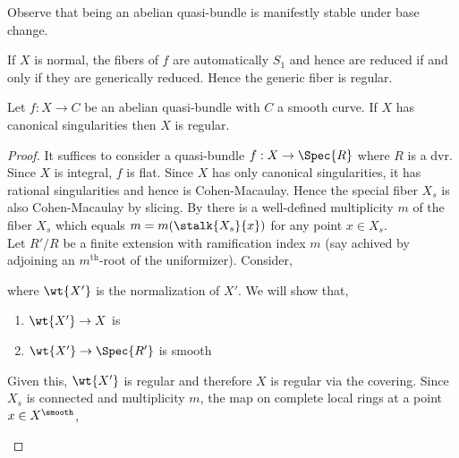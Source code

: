 \documentclass[12pt]{article}
\begin{document}
\begin{rmk}
Observe that being an abelian quasi-bundle is manifestly stable under base change.
\end{rmk}

\begin{rmk}
If $X$ is normal, the fibers of $f$ are automatically $S_1$ and hence are reduced if and only if they are generically reduced. Hence the generic fiber is regular.
\end{rmk}


\begin{lemma} \label{quasi_bundle_regular}
Let $f : X \to C$ be an abelian quasi-bundle with $C$ a smooth curve. If $X$ has canonical singularities then $X$ is regular. 
\end{lemma}

\begin{proof}
It suffices to consider a quasi-bundle $f : X \to \Spec{R}$ where $R$ is a dvr. Since $X$ is integral, $f$ is flat. Since $X$ has only canonical singularities, it has rational singularities and hence is Cohen-Macaulay. Hence the special fiber $X_s$ is also Cohen-Macaulay by slicing. By \cite[Lemma 2.1]{multiple_structures} there is a well-defined multiplicity $m$ of the fiber $X_s$ which equals $m = m(\stalk{X_s}{x})$ for any point $x \in X_s$.
\bigskip\\
Let $R' / R$ be a finite extension with ramification index $m$ (say achived by adjoining an $m^{\text{th}}$-root of the uniformizer). Consider,
\begin{center}
\end{center}
where $\wt{X'}$ is the normalization of $X'$. We will show that,
\begin{enumerate}
\item  $\wt{X'} \to X$ is \etale
\item  $\wt{X'} \to \Spec{R'}$ is smooth
\end{enumerate}
Given this, $\wt{X'}$ is regular and therefore $X$ is regular via the \etale covering. Since $X_s$ is connected and multiplicity $m$, the  map on complete local rings at a point $x \in X^{\smooth}$,
\begin{center}
\end{center}
\end{proof}
\end{document}
